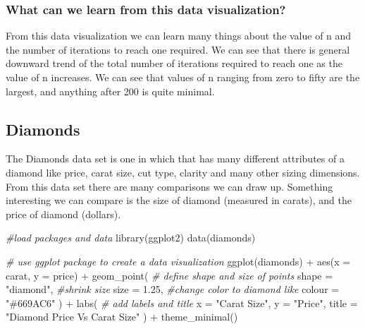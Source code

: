 \documentclass[
]{article}
\newenvironment{Shaded}{\begin{snugshade}}{\end{snugshade}}
\newcommand{\AttributeTok}[1]{\textcolor[rgb]{0.77,0.63,0.00}{#1}}
\newcommand{\CommentTok}[1]{\textcolor[rgb]{0.56,0.35,0.01}{\textit{#1}}}
\newcommand{\FloatTok}[1]{\textcolor[rgb]{0.00,0.00,0.81}{#1}}
\newcommand{\FunctionTok}[1]{\textcolor[rgb]{0.00,0.00,0.00}{#1}}
\newcommand{\NormalTok}[1]{#1}
\newcommand{\SpecialCharTok}[1]{\textcolor[rgb]{0.00,0.00,0.00}{#1}}
\newcommand{\StringTok}[1]{\textcolor[rgb]{0.31,0.60,0.02}{#1}}
\begin{document}
\hypertarget{what-can-we-learn-from-this-data-visualization}{%
\subsubsection{What can we learn from this data
visualization?}\label{what-can-we-learn-from-this-data-visualization}}

From this data visualization we can learn many things about the value of
n and the number of iterations to reach one required. We can see that
there is general downward trend of the total number of iterations
required to reach one as the value of n increases. We can see that
values of n ranging from zero to fifty are the largest, and anything
after 200 is quite minimal.

\hypertarget{diamonds}{%
\subsection{Diamonds}\label{diamonds}}

The Diamonds data set is one in which that has many different attributes
of a diamond like price, carat size, cut type, clarity and many other
sizing dimensions. From this data set there are many comparisons we can
draw up. Something interesting we can compare is the size of diamond
(measured in carats), and the price of diamond (dollars).

\begin{Shaded}
\begin{Highlighting}[]
\CommentTok{\#load packages and data}
\FunctionTok{library}\NormalTok{(ggplot2)}
\FunctionTok{data}\NormalTok{(diamonds)}

\CommentTok{\# use ggplot package to create a data visualization}
\FunctionTok{ggplot}\NormalTok{(diamonds) }\SpecialCharTok{+}
  \FunctionTok{aes}\NormalTok{(}\AttributeTok{x =}\NormalTok{ carat, }\AttributeTok{y =}\NormalTok{ price) }\SpecialCharTok{+}
  \FunctionTok{geom\_point}\NormalTok{(}
    \CommentTok{\# define shape and size of points }
    \AttributeTok{shape =} \StringTok{"diamond"}\NormalTok{,}
    \CommentTok{\#shrink size}
    \AttributeTok{size =} \FloatTok{1.25}\NormalTok{,}
    \CommentTok{\#change color to diamond like}
    \AttributeTok{colour =} \StringTok{"\#669AC6"}
\NormalTok{  ) }\SpecialCharTok{+}
  \FunctionTok{labs}\NormalTok{(}
    \CommentTok{\# add labels and title}
    \AttributeTok{x =} \StringTok{"Carat Size"}\NormalTok{,}
    \AttributeTok{y =} \StringTok{"Price"}\NormalTok{,}
    \AttributeTok{title =} \StringTok{"Diamond Price Vs Carat Size"}
\NormalTok{  ) }\SpecialCharTok{+}
  \FunctionTok{theme\_minimal}\NormalTok{()}
\end{Highlighting}
\end{Shaded}
\end{document}
